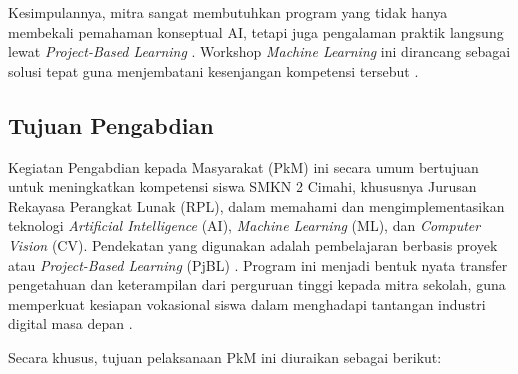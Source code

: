 Kesimpulannya, mitra sangat membutuhkan program yang tidak hanya membekali pemahaman konseptual AI, tetapi juga pengalaman praktik langsung lewat \textit{Project-Based Learning} \parencite{Wahyudi2024}. Workshop \textit{Machine Learning} ini dirancang sebagai solusi tepat guna menjembatani kesenjangan kompetensi tersebut \parencite{Andriani2025}.

\subsection{Tujuan Pengabdian}

Kegiatan Pengabdian kepada Masyarakat (PkM) ini secara umum bertujuan untuk meningkatkan kompetensi siswa SMKN 2 Cimahi, khususnya Jurusan Rekayasa Perangkat Lunak (RPL), dalam memahami dan mengimplementasikan teknologi \textit{Artificial Intelligence} (AI), \textit{Machine Learning} (ML), dan \textit{Computer Vision} (CV). Pendekatan yang digunakan adalah pembelajaran berbasis proyek atau \textit{Project-Based Learning} (PjBL) \parencite{PANE2025, Wahyudi2024}. Program ini menjadi bentuk nyata transfer pengetahuan dan keterampilan dari perguruan tinggi kepada mitra sekolah, guna memperkuat kesiapan vokasional siswa dalam menghadapi tantangan industri digital masa depan \parencite{Nadzinski2023}.

Secara khusus, tujuan pelaksanaan PkM ini diuraikan sebagai berikut:

